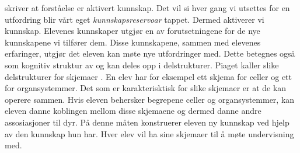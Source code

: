 \documentclass[main.tex]{subfiles}
\begin{document}


 skriver at forståelse er aktivert kunnskap. Det vil si hver gang vi utsettes for en utfordring blir vårt eget \emph{kunnskapsreservoar}
tappet. Dermed aktiverer vi kunnskap. Elevenes kunnskaper utgjør en av forutsetningene for de nye kunnskapene vi tilfører dem. Disse kunnskapene, sammen med
elevenes erfaringer, utgjør det eleven kan møte nye utfordringer med. Dette betegnes også som kognitiv struktur av \citeauthor{solv92} og kan deles opp i 
delstrukturer. Piaget kaller slike delstrukturer for skjemaer . En elev har for eksempel ett skjema for celler og ett for organsystemmer. 
Det som er karakterisktisk for slike skjemaer er at de kan operere sammen. Hvis eleven behersker begrepene celler og organsystemmer, kan eleven danne koblingen
mellom disse skjemaene og dermed danne andre assosiasjoner til dyr. På denne måten konstruerer eleven ny kunnskap ved hjelp av den kunnskap hun har.
Hver elev vil ha sine skjemaer til å møte undervisning med.



\end{document}
